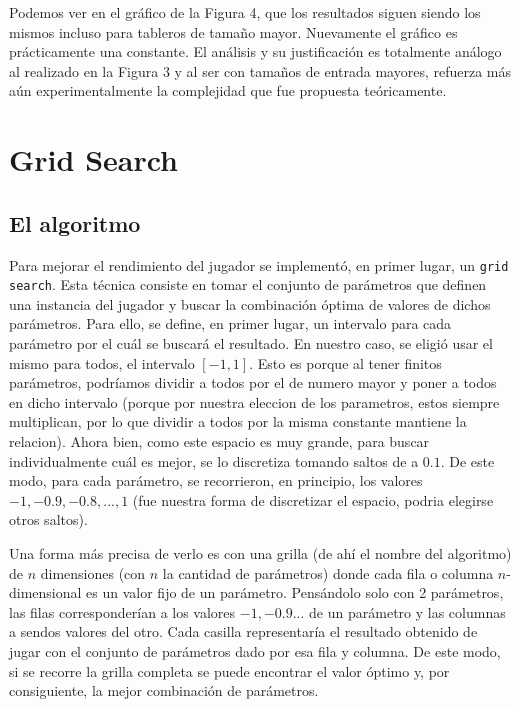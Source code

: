 \documentclass[A4paper,oneside,fleqn,11pt]{article}
\theoremstyle{definition}
\begin{document}
Podemos ver en el gráfico de la Figura 4, que los resultados siguen siendo los mismos incluso para tableros de tamaño mayor. Nuevamente el gráfico es prácticamente una constante. El análisis y su justificación es totalmente análogo al realizado en la Figura 3 y al ser con tamaños de entrada mayores, refuerza más aún experimentalmente la complejidad que fue propuesta teóricamente.






\section{Grid Search}



\subsection{El algoritmo}

Para mejorar el rendimiento del jugador se implementó, en primer lugar, un \texttt{grid search}. Esta técnica consiste en tomar el conjunto de parámetros que definen una instancia del jugador y buscar la combinación óptima de valores de dichos parámetros. Para ello, se define, en primer lugar, un intervalo para cada parámetro por el cuál se buscará el resultado. En nuestro caso, se eligió usar el mismo para todos, el intervalo $[-1,1]$. Esto es porque al tener finitos parámetros, podríamos dividir a todos por el de numero mayor y poner a todos en dicho intervalo (porque por nuestra eleccion de los parametros, estos siempre multiplican, por lo que dividir a todos por la misma constante mantiene la relacion). Ahora bien, como este espacio es muy grande, para buscar individualmente cuál es mejor, se lo discretiza tomando saltos de a $0.1$. De este modo, para cada parámetro, se recorrieron, en principio, los valores $-1, -0.9,-0.8,...,1$ (fue nuestra forma de discretizar el espacio, podria elegirse otros saltos). 

Una forma más precisa de verlo es con una grilla (de ahí el nombre del algoritmo) de $n$ dimensiones (con $n$ la cantidad de parámetros) donde cada fila o columna $n$-dimensional es un valor fijo de un parámetro. Pensándolo solo con 2 parámetros, las filas corresponderían a los valores $-1, -0.9...$ de un parámetro y las columnas a sendos valores del otro. Cada casilla representaría el resultado obtenido de jugar con el conjunto de parámetros dado por esa fila y columna. De este modo, si se recorre la grilla completa se puede encontrar el valor óptimo y, por consiguiente, la mejor combinación de parámetros.
\end{document}

